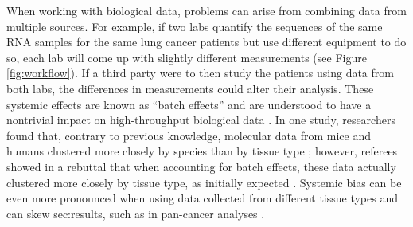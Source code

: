 \documentclass[notitlepage]{article}
\begin{document}
When working with biological data, problems can arise from combining data from multiple sources.
For example, if two labs quantify the sequences of the same RNA samples for the same lung cancer patients but use different equipment to do so, each lab will come up with slightly different measurements (see Figure \ref{fig:workflow}).
If a third party were to then study the patients using data from both labs, the differences in measurements could alter their analysis.
These systemic effects are known as ``batch effects'' and are understood to have a nontrivial impact on high-throughput biological data \citep{leek_tackling_2010}.
In one study, researchers found that, contrary to previous knowledge, molecular data from mice and humans clustered more closely by species than by tissue type \citep{yue_comparative_2014};
however, referees showed in a rebuttal that when accounting for batch effects, these data actually clustered more closely by tissue type, as initially expected \citep{gilad_reanalysis_2015}.
Systemic bias can be even more pronounced when using data collected from different tissue types and can skew sec:results, such as in pan-cancer analyses \citep{dayton_classifying_2017-1}.
\end{document}
